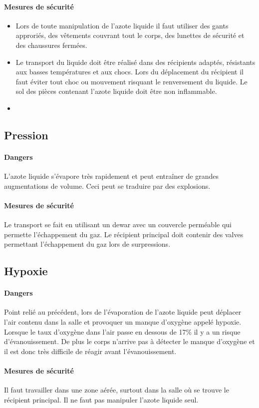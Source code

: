 \paragraph*{Mesures de sécurité}
\begin{itemize}
  \item Lors de toute manipulation de l'azote liquide il faut utiliser des gants approriés, des vêtements couvrant tout le corps, des lunettes de sécurité et des chaussures fermées.
  \item Le transport du liquide doit être réalisé dans des récipients adaptés, résistants aux basses températures et aux chocs. Lors du déplacement du récipient il faut éviter tout choc ou mouvement risquant le renversement du liquide. Le sol des pièces contenant l'azote liquide doit être non inflammable.
  \item 
\end{itemize}

\subsection*{Pression}
\paragraph*{Dangers}
L'azote liquide s'évapore très rapidement et peut entraîner de grandes augmentations de volume. Ceci peut se traduire par des explosions.
\paragraph*{Mesures de sécurité}
Le transport se fait en utilisant un dewar avec un couvercle perméable qui permette l'échappement du gaz. Le récipient principal doit contenir des valves permettant l'échappement du gaz lors de surpressions.

\subsection*{Hypoxie}
\paragraph*{Dangers}
Point relié au précédent, lors de l'évaporation de l'azote liquide peut déplacer l'air contenu dans la salle et provoquer un manque d'oxygène appelé hypoxie. Lorsque le taux d'oxygène dans l'air passe en dessous de 17\% il y a un risque d'évanouissement. De plus le corps n'arrive pas à détecter le manque d'oxygène et il est donc très difficile de réagir avant l'évanouissement.
\paragraph*{Mesures de sécurité}
Il faut travailler dans une zone aérée, surtout dans la salle où se trouve le récipient principal. Il ne faut pas manipuler l'azote liquide seul.




